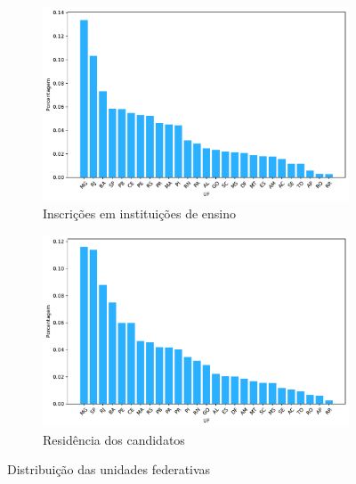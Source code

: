                     \begin{figure}[h]
                        \centering
                    
                        \begin{subfigure}{\textwidth}
                            \centering
                            \includegraphics[width=\linewidth]{figuras/distribuicao_ies.pdf}
                            \caption{Inscrições em instituições de ensino}
                        \end{subfigure}
                        \hfill
                        \begin{subfigure}{\textwidth}
                            \centering
                            \includegraphics[width=\linewidth]{figuras/distribuicao_residencia_candidatos.pdf}
                            \caption{Residência dos candidatos}
                        \end{subfigure}
                    
                        \caption{Distribuição das unidades federativas}
                        \label{fig:distribuicao-uf}
                    \end{figure}